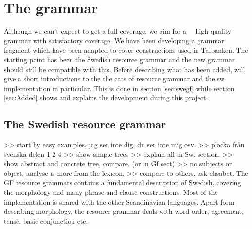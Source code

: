 \documentclass{report}
\begin{document}
\chapter{The grammar}
\label{sec:prog.grammar}
Although we can't expect to get a full coverage, we aim for a ~~high-quality~~
grammar with satisfactory coverage.
We have been developing a grammar fragment which have been adapted to cover
constructions used in Talbanken. The starting point has been the Swedish
resource grammar and the new grammar should still be compatible with this.
Before describing what has been added, will give a short introductions to the
the cats of resource grammar and the sw implementation in particular.
This is done in section \ref{sec:swegf} while section \ref{sec:Added} shows and
explains the development during this project.


\section{The Swedish resource grammar}
>> start by easy examples, jag ser inte dig, du ser inte mig osv. 
>> plocka från svenska delen 1 2 4 
>> show simple trees
>> explain all in Sw. section.
>> show abstract and concrete tree, compare. (or in Gf sect)
>> no subjects or object, analyse is more from the lexicon,
>> compare to others, ask elisabet.
\label{sec:swegf}
The GF resource grammars contains a fundamental description of Swedish,
covering the morphology and many phrase and clause constructions. Most of the implementation
is shared with the other Scandinavian languages.
Apart form describing morphology, the resource grammar deals with
word order, agreement, tense, basic conjunction etc.
\end{document}
